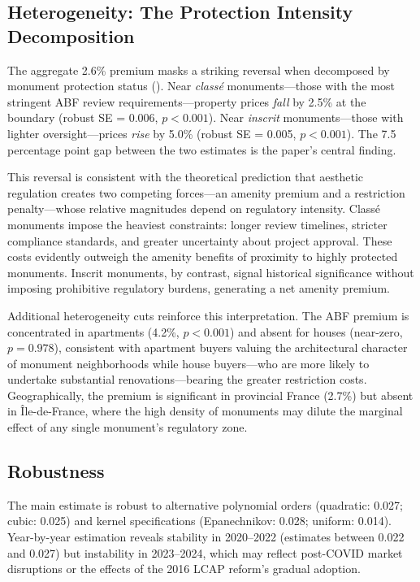 \documentclass[12pt]{article}
\begin{document}
\subsection{Heterogeneity: The Protection Intensity Decomposition}

The aggregate 2.6\% premium masks a striking reversal when decomposed by monument protection status (). Near \textit{class\'{e}} monuments---those with the most stringent ABF review requirements---property prices \textit{fall} by 2.5\% at the boundary (robust SE = 0.006, $p < 0.001$). Near \textit{inscrit} monuments---those with lighter oversight---prices \textit{rise} by 5.0\% (robust SE = 0.005, $p < 0.001$). The 7.5 percentage point gap between the two estimates is the paper's central finding.



This reversal is consistent with the theoretical prediction that aesthetic regulation creates two competing forces---an amenity premium and a restriction penalty---whose relative magnitudes depend on regulatory intensity. Class\'{e} monuments impose the heaviest constraints: longer review timelines, stricter compliance standards, and greater uncertainty about project approval. These costs evidently outweigh the amenity benefits of proximity to highly protected monuments. Inscrit monuments, by contrast, signal historical significance without imposing prohibitive regulatory burdens, generating a net amenity premium.

Additional heterogeneity cuts reinforce this interpretation. The ABF premium is concentrated in apartments (4.2\%, $p < 0.001$) and absent for houses (near-zero, $p = 0.978$), consistent with apartment buyers valuing the architectural character of monument neighborhoods while house buyers---who are more likely to undertake substantial renovations---bearing the greater restriction costs. Geographically, the premium is significant in provincial France (2.7\%) but absent in \^{I}le-de-France, where the high density of monuments may dilute the marginal effect of any single monument's regulatory zone.

\subsection{Robustness}

The main estimate is robust to alternative polynomial orders (quadratic: 0.027; cubic: 0.025) and kernel specifications (Epanechnikov: 0.028; uniform: 0.014). Year-by-year estimation reveals stability in 2020--2022 (estimates between 0.022 and 0.027) but instability in 2023--2024, which may reflect post-COVID market disruptions or the effects of the 2016 LCAP reform's gradual adoption.
\end{document}
